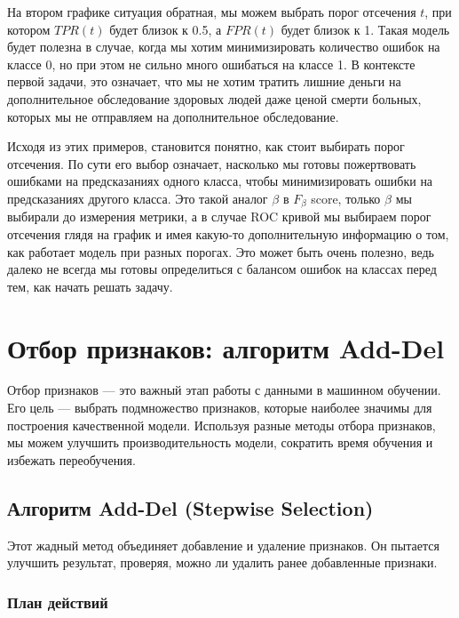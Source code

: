 На втором графике ситуация обратная, мы можем выбрать порог отсечения $t$, при котором $TPR(t)$ будет близок к 0.5, а $FPR(t)$ будет близок к 1.
Такая модель будет полезна в случае, когда мы хотим минимизировать количество ошибок на классе 0, но при этом не сильно много ошибаться на классе 1.
В контексте первой задачи, это означает, что мы не хотим тратить лишние деньги на дополнительное обследование здоровых людей даже ценой смерти больных, которых мы не отправляем на дополнительное обследование.

Исходя из этих примеров, становится понятно, как стоит выбирать порог отсечения. По сути его выбор означает, насколько мы готовы пожертвовать ошибками на предсказаниях одного класса, чтобы минимизировать ошибки на предсказаниях другого класса.
Это такой аналог $\beta$ в $F_{\beta}$ score, только $\beta$ мы выбирали до измерения метрики, а в случае ROC кривой мы выбираем порог отсечения глядя на график и имея какую-то дополнительную информацию о том, как работает модель при разных порогах.
Это может быть очень полезно, ведь далеко не всегда мы готовы определиться с балансом ошибок на классах перед тем, как начать решать задачу.


\section*{Отбор признаков: алгоритм Add-Del}

Отбор признаков — это важный этап работы с данными в машинном обучении. Его цель — выбрать подмножество признаков, которые наиболее значимы для построения качественной модели. Используя разные методы отбора признаков, мы можем улучшить производительность модели, сократить время обучения и избежать переобучения. 




\subsection*{Алгоритм Add-Del (Stepwise Selection)}

Этот жадный метод объединяет добавление и удаление признаков. Он пытается улучшить результат, проверяя, можно ли удалить ранее добавленные признаки.

\subsubsection*{План действий}

